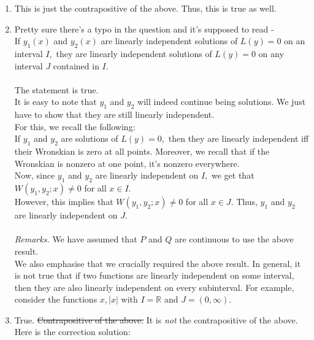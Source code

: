 \documentclass[12pt]{article}
\theoremstyle{definition}
\numberwithin{thm}{section}
\begin{document}
\begin{enumerate}[leftmargin=*, label = Q.\arabic*.]
\begin{enumerate}[label = (\roman*)]
\begin{proof}
			We show that this is possible only if $\alpha = \beta = 0.$ This will prove linear independence.\\
			From (\ref{eq:linJ}), we can deduce that
			\begin{equation} \label{eq:linI}
			\alpha y_1(x) + \beta y_2(x) = 0 \quad \forall x \in I.
			\end{equation}
			(Why?)\\
			However, $y_1$ and $y_2$ were assumed to be linearly independent on $I.$ Thus, from (\ref{eq:linI}), we can conclude that $\alpha = \beta = 0,$ as desired.
		\end{proof}
		\item This is just the contrapositive of the above. Thus, this is true as well.
		\item Pretty sure there's a typo in the question and it's supposed to read -\\
		If $y_1(x)$ and $y_2(x)$ are linearly independent solutions of $L(y) = 0$ on an interval $I,$ they are linearly independent solutions of $L(y) = 0$ on any interval $J$ contained in $I.$\\\\
		The statement is true.\\
		It is easy to note that $y_1$ and $y_2$ will indeed continue being solutions. We just have to show that they are still linearly independent.\\
		For this, we recall the following:\\
		If $y_1$ and $y_2$ are solutions of $L(y) = 0,$ then they are linearly independent iff their Wronskian is zero at all points. Moreover, we recall that if the Wronskian is nonzero at one point, it's nonzero everywhere.\\
		Now, since $y_1$ and $y_2$ are linearly independent on $I,$ we get that $W(y_1, y_2;x) \neq 0$ for all $x \in I.$\\
		However, this implies that $W(y_1, y_2;x) \neq 0$ for all $x \in J.$ Thus, $y_1$ and $y_2$ are linearly independent on $J.$\\\\
		\emph{Remarks.} We have assumed that $P$ and $Q$ are continuous to use the above result.\\
		We also emphasise that we crucially required the above result. In general, it is not true that if two functions are linearly independent on some interval, then they are also linearly independent on every subinterval. For example, consider the functions $x, |x|$ with $I = \mathbb{R}$ and $J = (0, \infty).$
		\item True. {\color{myupdatecolor}\st{Contrapositive of the above.} }It is \emph{not} the contrapositive of the above. \\
		Here is the correction solution:


\end{enumerate}
\end{enumerate}
\end{document}
